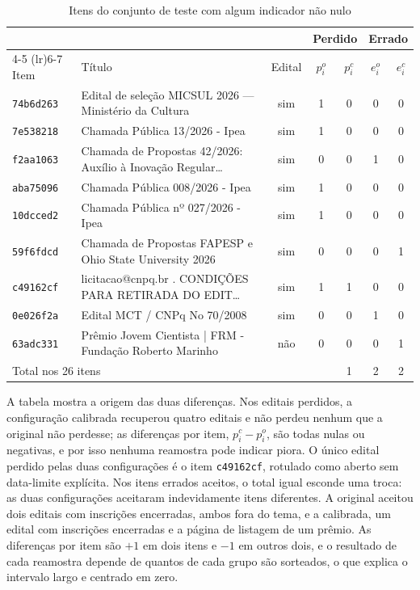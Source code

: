 \begin{table}[htbp]
\centering
\caption{Itens do conjunto de teste com algum indicador não nulo}
\label{tab:bootstrap_itens}
\footnotesize
\setlength{\tabcolsep}{4pt}
\begin{tabularx}{\textwidth}{l >{\raggedright\arraybackslash}X c c c c c}
\toprule
 & & & \multicolumn{2}{c}{Perdido} & \multicolumn{2}{c}{Errado} \\
\cmidrule(lr){4-5} \cmidrule(lr){6-7}
Item & Título & Edital & $p_i^{o}$ & $p_i^{c}$ & $e_i^{o}$ & $e_i^{c}$ \\
\midrule
\texttt{74b6d263} & Edital de seleção MICSUL 2026 --- Ministério da Cultura & sim & 1 & 0 & 0 & 0 \\
\texttt{7e538218} & Chamada Pública 13/2026 - Ipea & sim & 1 & 0 & 0 & 0 \\
\texttt{f2aa1063} & Chamada de Propostas 42/2026: Auxílio à Inovação Regular\ldots{} & sim & 0 & 0 & 1 & 0 \\
\texttt{aba75096} & Chamada Pública 008/2026 - Ipea & sim & 1 & 0 & 0 & 0 \\
\texttt{10dcced2} & Chamada Pública nº 027/2026 - Ipea & sim & 1 & 0 & 0 & 0 \\
\texttt{59f6fdcd} & Chamada de Propostas FAPESP e Ohio State University 2026 & sim & 0 & 0 & 0 & 1 \\
\texttt{c49162cf} & [PDF] licitacao@cnpq.br . CONDIÇÕES PARA RETIRADA DO EDIT\ldots{} & sim & 1 & 1 & 0 & 0 \\
\texttt{0e026f2a} & Edital MCT / CNPq No 70/2008 & sim & 0 & 0 & 1 & 0 \\
\texttt{63adc331} & Prêmio Jovem Cientista | FRM - Fundação Roberto Marinho & não & 0 & 0 & 0 & 1 \\
\midrule
\multicolumn{3}{l}{Total nos 26 itens} & 5 & 1 & 2 & 2 \\
\bottomrule
\end{tabularx}
\end{table}

A tabela mostra a origem das duas diferenças. Nos editais perdidos, a
configuração calibrada recuperou quatro editais e não perdeu nenhum que a
original não perdesse; as diferenças por item, $p_i^{c} - p_i^{o}$, são todas
nulas ou negativas, e por isso nenhuma reamostra pode indicar piora. O único
edital perdido pelas duas configurações é o item \texttt{c49162cf}, rotulado
como aberto sem data-limite explícita. Nos itens errados aceitos, o total igual
esconde uma troca: as duas configurações aceitaram indevidamente itens
diferentes. A original aceitou dois editais com inscrições encerradas, ambos
fora do tema, e a calibrada, um edital com inscrições encerradas e a página de
listagem de um prêmio. As diferenças por item são $+1$ em dois itens e $-1$ em outros dois,
e o resultado de cada reamostra depende de quantos de cada grupo são
sorteados, o que explica o intervalo largo e centrado em zero.
